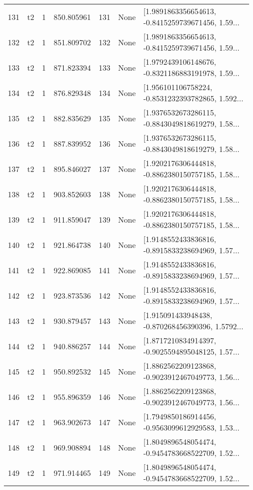 \begin{tabular}{lllrlll}
131 &  t2 &   1 &   850.805961 &  131 &  None &  [1.9891863356654613, -0.8415259739671456, 1.59... \\
132 &  t2 &   1 &   851.809702 &  132 &  None &  [1.9891863356654613, -0.8415259739671456, 1.59... \\
133 &  t2 &   1 &   871.823394 &  133 &  None &  [1.9792439106148676, -0.8321186883191978, 1.59... \\
134 &  t2 &   1 &   876.829348 &  134 &  None &  [1.956101106758224, -0.8531232393782865, 1.592... \\
135 &  t2 &   1 &   882.835629 &  135 &  None &  [1.9376532673286115, -0.8843049818619279, 1.58... \\
136 &  t2 &   1 &   887.839952 &  136 &  None &  [1.9376532673286115, -0.8843049818619279, 1.58... \\
137 &  t2 &   1 &   895.846027 &  137 &  None &  [1.9202176306444818, -0.8862380150757185, 1.58... \\
138 &  t2 &   1 &   903.852603 &  138 &  None &  [1.9202176306444818, -0.8862380150757185, 1.58... \\
139 &  t2 &   1 &   911.859047 &  139 &  None &  [1.9202176306444818, -0.8862380150757185, 1.58... \\
140 &  t2 &   1 &   921.864738 &  140 &  None &  [1.9148552433836816, -0.8915833238694969, 1.57... \\
141 &  t2 &   1 &   922.869085 &  141 &  None &  [1.9148552433836816, -0.8915833238694969, 1.57... \\
142 &  t2 &   1 &   923.873536 &  142 &  None &  [1.9148552433836816, -0.8915833238694969, 1.57... \\
143 &  t2 &   1 &   930.879457 &  143 &  None &  [1.915091433948438, -0.870268456390396, 1.5792... \\
144 &  t2 &   1 &   940.886257 &  144 &  None &  [1.8717210834914397, -0.9025594895048125, 1.57... \\
145 &  t2 &   1 &   950.892532 &  145 &  None &  [1.8862562209123868, -0.9023912467049773, 1.56... \\
146 &  t2 &   1 &   955.896359 &  146 &  None &  [1.8862562209123868, -0.9023912467049773, 1.56... \\
147 &  t2 &   1 &   963.902673 &  147 &  None &  [1.7949850186914456, -0.9563099612929583, 1.53... \\
148 &  t2 &   1 &   969.908894 &  148 &  None &  [1.8049896548054474, -0.9454783668522709, 1.52... \\
149 &  t2 &   1 &   971.914465 &  149 &  None &  [1.8049896548054474, -0.9454783668522709, 1.52... \\

\end{tabular}
